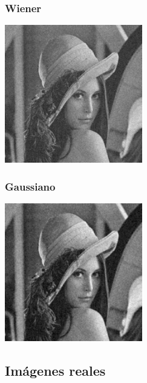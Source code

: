 \documentclass{beamer}
\begin{document}
  \begin{frame}
    \frametitle{Wiener}
  
    \centering

    \includegraphics[width=6cm]{imgs/Comparacion/wiener_Lenna.jpg}
  
  \end{frame}


  \begin{frame}
    \frametitle{Gaussiano}
  
    \centering
    \includegraphics[width=6cm]{imgs/Comparacion/gaussian_Lenna.jpg}
  
  \end{frame}

  \subsection{Imágenes reales}
\end{document}
